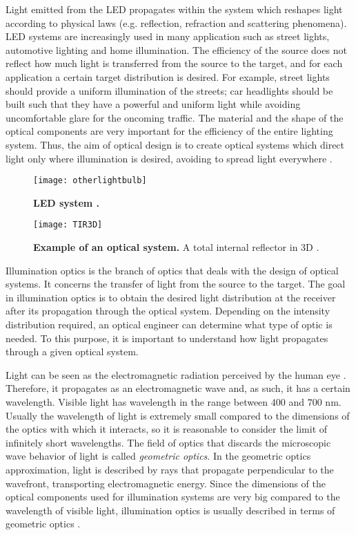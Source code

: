 Light emitted from the LED propagates within the system which reshapes light according to physical laws (e.g. reflection, refraction and scattering phenomena). LED systems are increasingly used in many application such as street lights, automotive lighting and home illumination. The efficiency of the source does not reflect how much light is transferred from the source to the target, and for each application a certain target distribution is desired. For example, street lights should provide a uniform illumination of the streets; car headlights should be built such that they have a powerful and uniform light while avoiding uncomfortable glare for the oncoming traffic. The material and the shape of the optical components are very important for the efficiency of the entire lighting system. Thus, the aim of optical design is to create optical systems which direct light only where illumination is desired, avoiding to spread light everywhere \cite{taguchi2008present, haitz2011solid}. 
\begin{figure}[h]
\centering
  \begin{minipage}[t]{0.42\textwidth}
    \texttt{[image: otherlightbulb]}
    \caption{\textbf{LED system \cite{Schweber}.}}
    \label{fig:led}
\end{minipage}\hfill
 \begin{minipage}[t]{0.42\textwidth}
    \texttt{[image: TIR3D]}
    \caption{\textbf{Example of an optical system.} A total internal reflector in $3$D \cite{prins2014inverse}.}
    \label{fig:tir_example_3D}
\end{minipage}
\end{figure}

Illumination optics is the branch of optics that deals with the design of optical systems. It concerns the transfer of light from the source to the target. The goal in illumination optics is to obtain the desired light distribution at the receiver after its propagation through the optical system. Depending on the intensity distribution required, an optical engineer can determine what type of optic is needed. To this purpose, it is important to understand how light propagates through a given optical system.

Light can be seen as the electromagnetic radiation perceived by the human eye \cite{schreuder2008outdoor}. Therefore, it propagates as an electromagnetic wave and, as such, it has a certain wavelength. Visible light has wavelength in the range between $400$ and $700$ nm. Usually the wavelength of light is extremely small compared to the dimensions of the optics with which it interacts, so it is reasonable to consider the limit of infinitely short wavelengths. The field of optics that discards the microscopic wave behavior of light is called \textit{geometric optics}. In the geometric optics approximation, light is described by rays that propagate perpendicular to the wavefront, transporting electromagnetic energy. Since the dimensions of the optical components used for illumination systems are very big compared to the wavelength of visible light, illumination optics is usually described in terms of geometric optics \cite{born2013principles}. 

